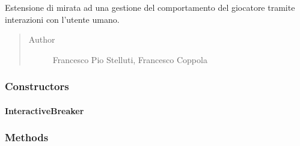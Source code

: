 \documentclass[letterpaper,10pt,italian]{sphinxmanual}
\begin{document}
\begin{fulllineitems}
\label{\detokenize{source/it/unicam/cs/pa/mastermind/players/InteractiveBreaker:it.unicam.cs.pa.mastermind.players.InteractiveBreaker}}
Estensione di  mirata ad una gestione del comportamento del giocatore tramite interazioni con l’utente umano.
\begin{quote}\begin{description}
\item[{Author}] \leavevmode
Francesco Pio Stelluti, Francesco Coppola

\end{description}\end{quote}

\end{fulllineitems}



\subsubsection{Constructors}
\label{\detokenize{source/it/unicam/cs/pa/mastermind/players/InteractiveBreaker:constructors}}

\paragraph{InteractiveBreaker}
\label{\detokenize{source/it/unicam/cs/pa/mastermind/players/InteractiveBreaker:id1}}

\begin{fulllineitems}
\label{\detokenize{source/it/unicam/cs/pa/mastermind/players/InteractiveBreaker:it.unicam.cs.pa.mastermind.players.InteractiveBreaker.InteractiveBreaker()}}
\end{fulllineitems}



\subsubsection{Methods}
\label{\detokenize{source/it/unicam/cs/pa/mastermind/players/InteractiveBreaker:methods}}
\end{document}
